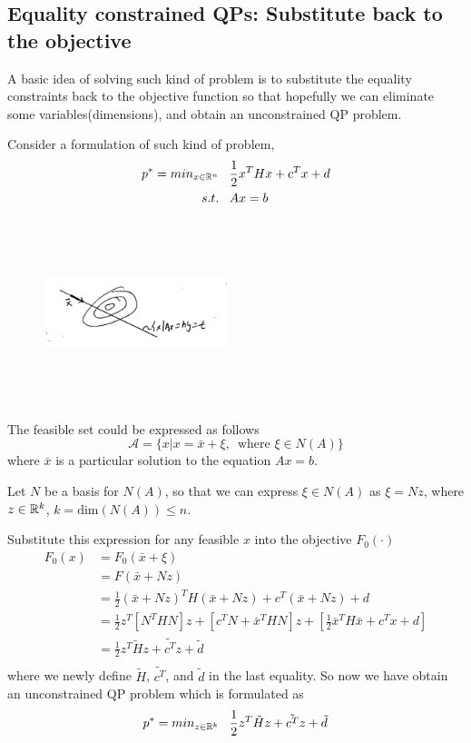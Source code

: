 \subsection{Equality constrained QPs: Substitute back to the objective}
A basic idea of solving such kind of problem is to substitute the equality constraints back to the objective function so that hopefully we can eliminate some variables(dimensions), and obtain an unconstrained QP problem.

Consider a formulation of such kind of problem,
\begin{align*}
p^* = min_{x\in \mathbb{R}^n}\,\,\,\,\, &\frac{1}{2}x^THx + c^Tx + d\\
s.t.\,\,\,\,\, &Ax = b
\end{align*}


\begin{figure}
	\centering
	\includegraphics[width=2.1in,height=2.1in]{figures/ch07/figure1016_b.png}
\end{figure}

The feasible set could be expressed as follows
$$\mathcal{A} =\{x | x = \bar{x} + \xi,\,\,\, \text{where } \xi \in N(A) \}$$
where $\bar{x}$ is a particular solution to the equation $Ax=b$.

Let $N$ be a basis for $N(A)$, so that we can express $\xi \in N(A)$ as $\xi = Nz$, where $z\in \mathbb{R}^k$, $k =\text{dim}(N(A)) \leq n$.

Substitute this expression for any feasible $x$ into the objective $F_0(\cdot)$
\begin{align*}
F_0(x) 
&= F_0(\bar{x} + \xi)\\
&= F(\bar{x} + Nz)\\
&= \frac{1}{2}(\bar{x} + Nz)^TH(\bar{x}+Nz) + c^T(\bar{x} + Nz) + d\\
&= \frac{1}{2}z^T[N^THN]z + [c^TN + \bar{x}^THN]z + [\frac{1}{2}\bar{x}^TH\bar{x} + c^Tx + d] \\
&= \frac{1}{2}z^T\tilde{H}z + \tilde{c^T}z + \tilde{d}\\
\end{align*}
where we newly define $\tilde{H}$, $\tilde{c^T}$, and $\tilde{d}$ in the last equality. So now we have obtain an unconstrained QP problem which is formulated as
\begin{equation*}
p^* = min_{z\in \mathbb{R}^k}\,\,\,\,\, \frac{1}{2}z^T\tilde{H}z + \tilde{c^T}z + \tilde{d}
\end{equation*}

